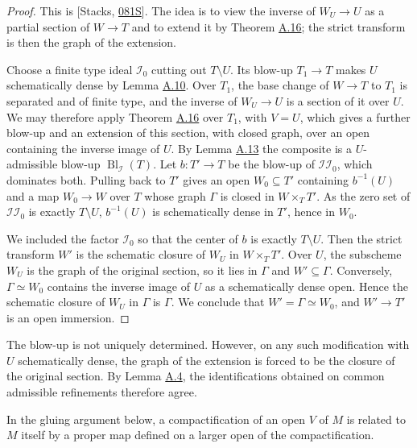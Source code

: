 \documentclass[11pt]{article}
\begin{document}
\begin{proof}[{Proof}]\label{bp49}%
This is [Stacks, \href{https://stacks.math.columbia.edu/tag/081S}{081S}]. The idea is to view the inverse of \(W_U\to U\) as a partial section of \(W\to T\) and to extend it by Theorem \hyperref[bp43]{A.16}; the strict transform is then the graph of the extension.

Choose a finite type ideal \(\mathcal I_0\) cutting out \(T\setminus U\). Its blow-up \(T_1\to T\) makes \(U\) schematically dense by Lemma \hyperref[bp29]{A.10}. Over \(T_1\), the base change of \(W\to T\) to \(T_1\) is separated and of finite type, and the inverse of \(W_U\to U\) is a section of it over \(U\). We may therefore apply Theorem \hyperref[bp43]{A.16} over \(T_1\), with \(V=U\), which gives a further blow-up and an extension of this section, with closed graph, over an open containing the inverse image of \(U\). By Lemma \hyperref[bp35]{A.13} the composite is a \(U\)-admissible blow-up \(\operatorname{Bl}_{\mathcal I}(T)\). Let \(b:T'\to T\) be the blow-up of \(\mathcal I\mathcal I_0\), which dominates both. Pulling back to \(T'\) gives an open \(W_0\subseteq T'\) containing \(b^{-1}(U)\) and a map \(W_0\to W\) over \(T\) whose graph \(\Gamma\) is closed in \(W\times_TT'\). As the zero set of \(\mathcal I\mathcal I_0\) is exactly \(T\setminus U\), \(b^{-1}(U)\) is schematically dense in \(T'\), hence in \(W_0\).

We included the factor \(\mathcal I_0\) so that the center of \(b\) is exactly \(T\setminus U\). Then the strict transform \(W'\) is the schematic closure of \(W_U\) in \(W\times_TT'\). Over \(U\), the subscheme \(W_U\) is the graph of the original section, so it lies in \(\Gamma\) and \(W'\subseteq\Gamma\). Conversely, \(\Gamma\simeq W_0\) contains the inverse image of \(U\) as a schematically dense open. Hence the schematic closure of \(W_U\) in \(\Gamma\) is \(\Gamma\). We conclude that \(W'=\Gamma\simeq W_0\), and \(W'\to T'\) is an open immersion.
\end{proof}

\label{bp50}%
The blow-up is not uniquely determined. However, on any such modification with \(U\) schematically dense, the graph of the extension is forced to be the closure of the original section. By Lemma \hyperref[bp14]{A.4}, the identifications obtained on common admissible refinements therefore agree.

In the gluing argument below, a compactification of an open \(V\) of \(M\) is related to \(M\) itself by a proper map defined on a larger open of the compactification.
\end{document}
